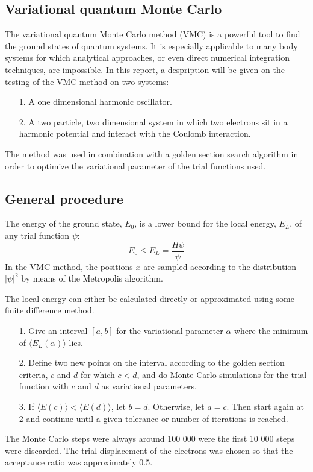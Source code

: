\documentclass[twocolumn]{article}
\begin{document}
\begin{large}
\section*{Variational quantum Monte Carlo}
The variational quantum Monte Carlo method (VMC) is a powerful tool to find the ground states of quantum systems. It is especially applicable to many body systems for which analytical approaches, or even direct numerical integration techniques, are impossible. In this report, a despription will be given on the testing of the VMC method on two systems:
\begin{itemize}
    \item[1.] A one dimensional harmonic oscillator.
    \item[2.] A two particle, two dimensional system in which two electrons sit in a harmonic potential and interact with the Coulomb interaction. 
\end{itemize}
The method was used in combination with a golden section search algorithm in order to optimize the variational parameter of the trial functions used.

\subsection*{General procedure}
The energy of the ground state, $E_0$, is a lower bound for the local energy, $E_L$, of any trial function $\psi$:
\begin{equation}
    E_0\leq E_L = \frac{H\psi}{\psi}
\end{equation}
In the VMC method, the positions $x$ are sampled according to the distribution $|\psi|^2$ by means of the Metropolis algorithm. 

The local energy can either be calculated directly or approximated using some finite difference method. 
\begin{itemize}
    \item[1.] Give an interval $[a,b]$ for the variational parameter $\alpha$ where the minimum of $\langle E_L(\alpha)\rangle$ lies. 
    \item[2.] Define two new points on the interval according to the golden section criteria, $c$ and $d$ for which $c<d$, and do Monte Carlo simulations for the trial function with $c$ and $d$ as variational parameters.
    \item[3.] If $\langle E(c)\rangle<\langle E(d)\rangle$, let $b=d$. Otherwise, let $a=c$. Then start again at 2 and continue until a given tolerance or number of iterations is reached. 
\end{itemize}
The Monte Carlo steps were always around 100 000 were the first 10 000 steps were discarded. The trial displacement of the electrons was chosen so that the acceptance ratio was approximately 0.5.



\end{large}
\end{document}
